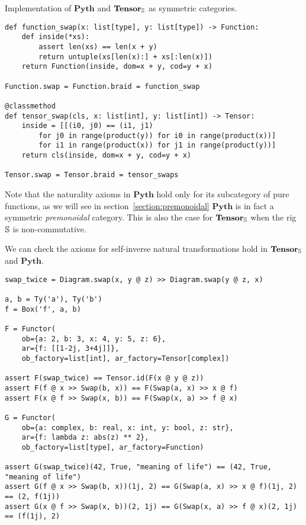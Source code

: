 \begin{python}
{\normalfont Implementation of $\mathbf{Pyth}$ and $\mathbf{Tensor}_\S$ as symmetric categories.}

\begin{verbatim}
def function_swap(x: list[type], y: list[type]) -> Function:
    def inside(*xs):
        assert len(xs) == len(x + y)
        return untuple(xs[len(x):] + xs[:len(x)])
    return Function(inside, dom=x + y, cod=y + x)

Function.swap = Function.braid = function_swap

@classmethod
def tensor_swap(cls, x: list[int], y: list[int]) -> Tensor:
    inside = [[(i0, j0) == (i1, j1)
        for j0 in range(product(y)) for i0 in range(product(x))]
        for i1 in range(product(x)) for j1 in range(product(y))]
    return cls(inside, dom=x + y, cod=y + x)

Tensor.swap = Tensor.braid = tensor_swaps
\end{verbatim}
\end{python}

Note that the naturality axioms in $\mathbf{Pyth}$ hold only for its subcategory of pure functions, as we will see in section~\ref{section:premonoidal} $\mathbf{Pyth}$ is in fact a symmetric \emph{premonoidal} category.
This is also the case for $\mathbf{Tensor}_\S$ when the rig $\S$ is non-commutative.

\begin{example}
We can check the axioms for self-inverse natural transformations hold in $\mathbf{Tensor}_\S$ and $\mathbf{Pyth}$.

\begin{verbatim}
swap_twice = Diagram.swap(x, y @ z) >> Diagram.swap(y @ z, x)

a, b = Ty('a'), Ty('b')
f = Box('f', a, b)

F = Functor(
    ob={a: 2, b: 3, x: 4, y: 5, z: 6},
    ar={f: [[1-2j, 3+4j]]},
    ob_factory=list[int], ar_factory=Tensor[complex])

assert F(swap_twice) == Tensor.id(F(x @ y @ z))
assert F(f @ x >> Swap(b, x)) == F(Swap(a, x) >> x @ f)
assert F(x @ f >> Swap(x, b)) == F(Swap(x, a) >> f @ x)

G = Functor(
    ob={a: complex, b: real, x: int, y: bool, z: str},
    ar={f: lambda z: abs(z) ** 2},
    ob_factory=list[type], ar_factory=Function)

assert G(swap_twice)(42, True, "meaning of life") == (42, True, "meaning of life")
assert G(f @ x >> Swap(b, x))(1j, 2) == G(Swap(a, x) >> x @ f)(1j, 2) == (2, f(1j))
assert G(x @ f >> Swap(x, b))(2, 1j) == G(Swap(x, a) >> f @ x)(2, 1j) == (f(1j), 2)
\end{verbatim}
\end{example}

